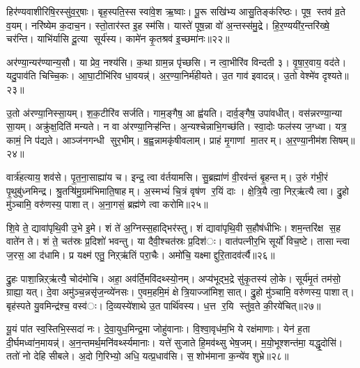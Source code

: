 हिर॑ण्यवाशीरिषि॒रस्सु॑व॒र्॒षाः। बृह॒स्पति॒स्स स्वा॑वे॒श ऋ॒ष्वाः। पू॒रू सखि॑भ्य आसु॒तिङ्क॑रिष्ठः। पूष॒ स्तव॑ व्र॒ते व॒यम्। नरि॑ष्येम क॒दाच॒न। स्तो॒तार॑स्त इ॒ह स्म॑सि। यास्ते॑ पूष॒न्ना वो॑ अ॒न्तस्स॑मु॒द्रे। हि॒र॒ण्ययी॑र॒न्तरि॑ख्षे॒ चर॑न्ति। याभि॑र्यासि दू॒त्या सूर्य॑स्य। कामे॑न कृ॒तश्रव॑ इ॒च्छमा॑नः॥२२॥

अर॑ण्या॒न्यर॑ण्यान्य॒सौ। या प्रेव॒ नश्य॑सि। क॒था ग्राम॒न्न पृ॑च्छसि। न त्वा॒भीरि॑व विन्दती ३। वृ॒षा॒र॒वाय॒ वद॑ते। यदु॒पाव॑ति चिच्चि॒कः। आ॒घा॒टीभि॑रिव धा॒वयन्न्॑। अ॒र॒ण्या॒निर्म॑हीयते। उ॒त गाव॑ इवादन्न्। उ॒तो वेश्मे॑व दृश्यते॥२३॥

उ॒तो अ॑रण्या॒निस्सा॒यम्। श॒क॒टीरि॑व सर्जति। गाम॒ङ्गैष॒ आ ह्व॑यति। दार्व॒ङ्गैष॒ उपा॑वधीत्। वस॑न्नरण्या॒न्या सा॒यम्। अक्रु॑क्ष॒दिति॑ मन्यते। न वा अ॑रण्या॒निऱ्ह॑न्ति। अ॒न्यश्चेन्नाभि॒गच्छ॑ति। स्वा॒दोः फल॑स्य ज॒ग्ध्वा। यत्र॒ कामं॒ नि प॑द्यते। आञ्ज॑नगन्धी सुर॒भीम्। ब॒ह्व॒न्नामकृ॑षीवलाम्। प्राहं मृ॒गाणां मा॒तरम्। अ॒र॒ण्या॒नीम॑शसिषम्॥२४॥


वार्त्र॑हत्याय॒ शव॑से। पृ॒त॒ना॒साह्या॑य च। इन्द्र॒ त्वा व॑र्तयामसि। सु॒ब्रह्मा॑णं वी॒रव॑न्तं बृ॒हन्तम्। उ॒रुं ग॑भी॒रं पृ॒थुबु॑ध्नमिन्द्र। श्रु॒तऱ्षि॑मु॒ग्रम॑भिमाति॒षाहम्। अ॒स्मभ्यं॑ चि॒त्रं वृष॑ण र॒यिं दाः। क्षे॒त्रि॒यै त्वा॒ निऱ्ऋ॑त्यै त्वा। द्रु॒हो मु॑ञ्चामि॒ वरु॑णस्य॒ पाशात्। अ॒ना॒गसं॒ ब्रह्म॑णे त्वा करोमि॥२५॥

शि॒वे ते॒ द्यावा॑पृथि॒वी उ॒भे इ॒मे। शं ते॑ अ॒ग्निस्स॒हाद्भिर॑स्तु। शं द्यावा॑पृथि॒वी स॒हौष॑धीभिः। शम॒न्तरि॑क्ष स॒ह वाते॑न ते। शं ते॒ चत॑स्रः प्र॒दिशो॑ भवन्तु। या दैवी॒श्चत॑स्रः प्र॒दिश॑ः। वात॑पत्नीर॒भि सूर्यो॑ विच॒ष्टे। तासान्त्वा ज॒रस॒ आ द॑धामि। प्र यक्ष्म॑ एतु॒ निऱ्ऋ॑तिं परा॒चैः। अमो॑चि॒ यक्ष्माद्दुरि॒तादव॑र्त्यै॥२६॥

द्रु॒हः पाशा॒न्निऱ्ऋ॑त्यै॒ चोद॑मोचि। अहा॒ अव॑र्ति॒मवि॑दथ्स्यो॒नम्। अप्य॑भूद्भ॒द्रे सु॑कृ॒तस्य॑ लो॒के। सूर्य॑मृ॒तं तम॑सो॒ ग्राह्या॒ यत्। दे॒वा अमु॑ञ्च॒न्नसृ॑ज॒न्व्ये॑नसः। ए॒वम॒हमि॒मं क्षेत्रि॒याज्जा॑मिश॒सात्। द्रु॒हो मु॑ञ्चामि॒ वरु॑णस्य॒ पाशात्। बृह॑स्पते यु॒वमिन्द्र॑श्च॒ वस्व॑ः। दि॒व्यस्ये॑शाथे उ॒त पार्थि॑वस्य। ध॒त्त र॒यि स्तु॑व॒ते की॒रये॑चित्॥२७॥

यू॒यं पा॑त स्व॒स्तिभि॒स्सदा॑ नः। दे॒वा॒युध॒मिन्द्र॒मा जोहु॑वानाः। वि॒श्वा॒वृध॑म॒भि ये रक्ष॑माणाः। येन॑ ह॒ता दी॒र्घमध्वा॑न॒मायन्न्॑। अ॒न॒न्तमर्थ॒मनि॑वर्थ्स्यमानाः। यत्ते॑ सुजाते हि॒मव॑थ्सु भेष॒जम्। म॒यो॒भूश्शन्त॑मा॒ यद्धृ॒दोसि॑। ततो॑ नो देहि सीबले। अ॒दो गि॒रिभ्यो॒ अधि॒ यत्प्र॒धाव॑सि। स॒शोभ॑माना क॒न्ये॑व शुभ्रे॥२८॥

